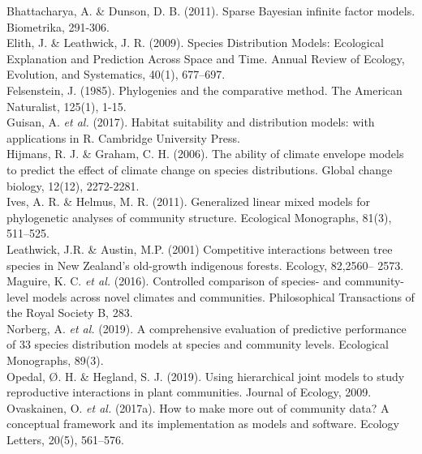 \documentclass{article}
\begin{document}
Bhattacharya, A. \& Dunson, D. B. (2011). Sparse Bayesian infinite factor models. Biometrika, 291-306.\\

Elith, J. \& Leathwick, J. R. (2009). Species Distribution Models: Ecological Explanation and Prediction Across Space and Time. Annual Review of Ecology, Evolution, and Systematics, 40(1), 677–697.\\

Felsenstein, J. (1985). Phylogenies and the comparative method. The American Naturalist, 125(1), 1-15.\\

Guisan, A. \textit{et al.}  (2017). Habitat suitability and distribution models: with applications in R. Cambridge University Press.\\

Hijmans, R. J. \& Graham, C. H. (2006). The ability of climate envelope models to predict the effect of climate change on species distributions. Global change biology, 12(12), 2272-2281.\\

Ives, A. R. \& Helmus, M. R. (2011). Generalized linear mixed models for phylogenetic analyses of community structure. Ecological Monographs, 81(3), 511–525. \\

Leathwick, J.R. \& Austin, M.P. (2001) Competitive interactions between tree species in New Zealand’s old-growth indigenous forests. Ecology, 82,2560– 2573.\\

Maguire, K. C. \textit{et al.} (2016). Controlled comparison of species- and community-level models across novel climates and communities. Philosophical Transactions of the Royal Society B, 283.\\

Norberg, A. \textit{et al.} (2019). A comprehensive evaluation of predictive performance of 33 species distribution models at species and community levels. Ecological Monographs, 89(3). \\

Opedal, Ø. H. \& Hegland, S. J. (2019). Using hierarchical joint models to study reproductive interactions in plant communities. Journal of Ecology, 2009. \\

Ovaskainen, O. \textit{et al.} (2017a). How to make more out of community data? A conceptual framework and its implementation as models and software. Ecology Letters, 20(5), 561–576.\\
\end{document}
